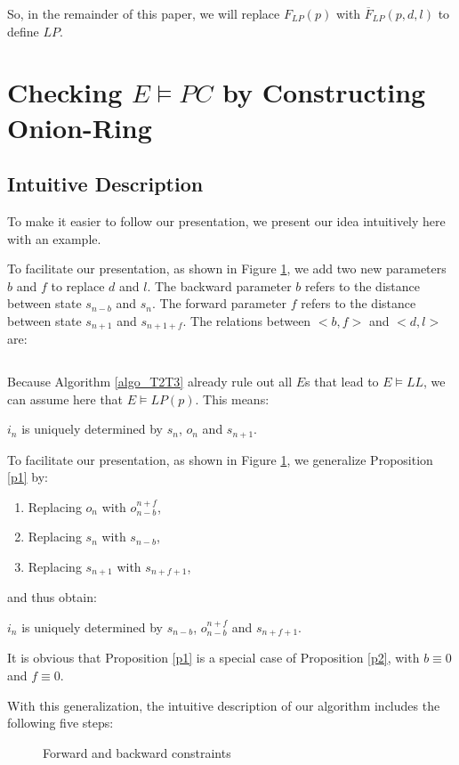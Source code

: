 \documentclass[journal]{IEEEtran}
\begin{document}
So,
in the remainder of this paper,
we will replace $F_{LP}(p)$ with $\overline{F}_{LP}(p,d,l)$ to define $LP$.


\section{Checking $E\vDash PC$ by Constructing Onion-Ring}\label{sec_t1t2}
\subsection{Intuitive Description}\label{subsec_intuitive}
To make it easier to follow our presentation,
we present our idea intuitively here with an example.

To facilitate our presentation,
as shown in Figure \ref{lr},
we add two new parameters $b$ and $f$ to replace $d$ and $l$.
The backward parameter $b$ refers to the distance between state $s_{n-b}$ and $s_n$.
The forward parameter $f$ refers to the distance between state $s_{n+1}$ and $s_{n+1+f}$.
The relations between $<b,f>$ and $<d,l>$ are:

\begin{equation}\label{eq_bfdl}
\end{equation}

Because Algorithm \ref{algo_T2T3} already rule out all $E$s that lead to $E\vDash LL$,
we can assume here that $E\vDash LP(p)$.
This means:

\begin{proposition}\label{p1}
$i_n$ is uniquely determined by $s_n$, $o_n$ and $s_{n+1}$.
\end{proposition}

To facilitate our presentation,
as shown in Figure \ref{lr},
we generalize Proposition \ref{p1} by:
\begin{enumerate}
\item Replacing $o_n$ with $o_{n-b}^{n+f}$,
\item Replacing $s_n$ with $s_{n-b}$,
\item Replacing $s_{n+1}$ with $s_{n+f+1}$,
\end{enumerate}
and thus obtain:
\begin{proposition}\label{p2}
$i_n$ is uniquely determined by $s_{n-b}$, $o_{n-b}^{n+f}$ and $s_{n+f+1}$.
\end{proposition}

It is obvious that Proposition \ref{p1} is a special case of Proposition \ref{p2},
with $b\equiv 0$ and $f\equiv 0$.

With this generalization,
the intuitive description of our algorithm includes the following five steps:
\begin{figure}[t]
\begin{center}
\end{center}
\caption{Forward and backward constraints}
  \label{lr}
\end{figure}
\end{document}
